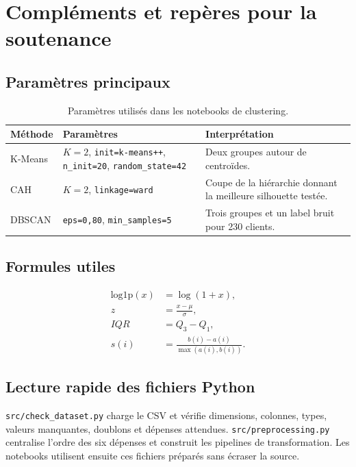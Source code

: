 \chapter{Compléments et repères pour la soutenance}

\section{Paramètres principaux}
\begin{table}[H]
\centering
\caption{Paramètres utilisés dans les notebooks de clustering.}
\label{tab:params}
\begin{tabularx}{\textwidth}{l l X}
\toprule
Méthode & Paramètres & Interprétation \\
\midrule
K-Means & $K=2$, \texttt{init=k-means++}, \texttt{n\_init=20}, \texttt{random\_state=42} & Deux groupes autour de centroïdes. \\
CAH & $K=2$, \texttt{linkage=ward} & Coupe de la hiérarchie donnant la meilleure silhouette testée. \\
DBSCAN & \texttt{eps=0,80}, \texttt{min\_samples=5} & Trois groupes et un label bruit pour 230 clients. \\
\bottomrule
\end{tabularx}
\end{table}

\section{Formules utiles}
\begin{align}
\text{log1p}(x)&=\log(1+x),\\
z&=\frac{x-\mu}{\sigma},\\
IQR&=Q_3-Q_1,\\
s(i)&=\frac{b(i)-a(i)}{\max(a(i),b(i))}.
\end{align}

\section{Lecture rapide des fichiers Python}
\texttt{src/check\_dataset.py} charge le CSV et vérifie dimensions, colonnes, types, valeurs manquantes, doublons et dépenses attendues. \texttt{src/preprocessing.py} centralise l'ordre des six dépenses et construit les pipelines de transformation. Les notebooks utilisent ensuite ces fichiers préparés sans écraser la source.

